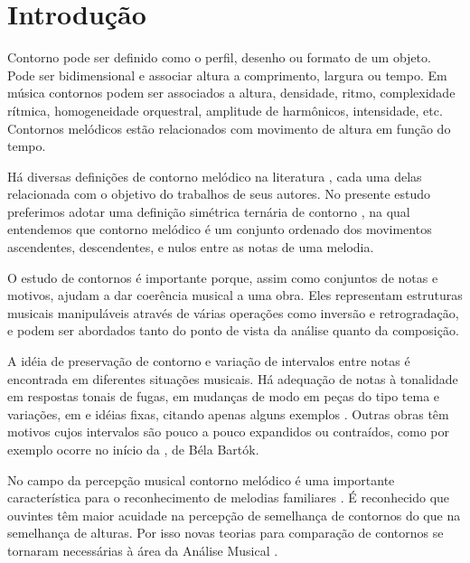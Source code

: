 \section{Introdução}
\label{sec:introducao}

Contorno pode ser definido como o perfil, desenho ou formato de um
objeto. Pode ser bidimensional e associar altura a comprimento,
largura ou tempo. Em música contornos podem ser associados a altura,
densidade, ritmo, complexidade rítmica, homogeneidade orquestral,
amplitude de harmônicos, intensidade, etc. Contornos melódicos estão
relacionados com movimento de altura em função do tempo.

Há diversas definições de contorno melódico na literatura
\cite{piston59:harmony,toch77:shaping,schonberg:fundamentals,adams76:melodic,marvin.ea87:relating,morris87:composition,clifford95:contour,beard03:contour},
cada uma delas relacionada com o objetivo do trabalhos de seus
autores. No presente estudo preferimos adotar uma definição simétrica
ternária de contorno \cite{polansky.ea92:possible}, na qual entendemos
que contorno melódico é um conjunto ordenado dos movimentos
ascendentes, descendentes, e nulos entre as notas de uma
melodia. 


O estudo de contornos é importante porque, assim como conjuntos de
notas e motivos, ajudam a dar coerência musical a uma obra. Eles
representam estruturas musicais manipuláveis através de várias
operações como inversão e retrogradação, e podem ser abordados tanto
do ponto de vista da análise quanto da composição.

A idéia de preservação de contorno e variação de intervalos entre
notas é encontrada em diferentes situações musicais. Há adequação de
notas à tonalidade em respostas tonais de fugas, em mudanças de modo
em peças do tipo tema e variações, em  e idéias fixas,
citando apenas alguns exemplos
\cite[p. 29]{morris87:composition}. Outras obras têm motivos cujos
intervalos são pouco a pouco expandidos ou contraídos, como por
exemplo ocorre no início da , de Béla Bartók. 

No campo da percepção musical contorno melódico é uma importante
característica para o reconhecimento de melodias familiares \cite[p.
136]{dowling.ea86:music}. É reconhecido que ouvintes têm maior
acuidade na percepção de semelhança de contornos do que na semelhança
de alturas. Por isso novas teorias para comparação de contornos se
tornaram necessárias à área da Análise Musical
\cite[p. 226]{marvin.ea87:relating}.

